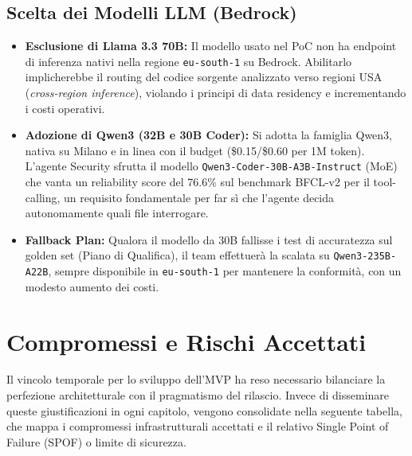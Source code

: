 \documentclass[11pt,a4paper]{article}
\begin{document}
\subsection{Scelta dei Modelli LLM (Bedrock)}

\begin{itemize}
    \item \textbf{Esclusione di Llama 3.3 70B:} Il modello usato nel PoC non ha endpoint di inferenza nativi nella regione \texttt{eu-south-1} su Bedrock. Abilitarlo implicherebbe il routing del codice sorgente analizzato verso regioni USA (\emph{cross-region inference}), violando i principi di data residency e incrementando i costi operativi.
    \item \textbf{Adozione di Qwen3 (32B e 30B Coder):} Si adotta la famiglia Qwen3, nativa su Milano e in linea con il budget (\$0.15/\$0.60 per 1M token). L'agente Security sfrutta il modello \texttt{Qwen3-Coder-30B-A3B-Instruct} (MoE) che vanta un reliability score del 76.6\% sul benchmark BFCL-v2 per il tool-calling, un requisito fondamentale per far sì che l'agente decida autonomamente quali file interrogare.
    \item \textbf{Fallback Plan:} Qualora il modello da 30B fallisse i test di accuratezza sul golden set (Piano di Qualifica), il team effettuerà la scalata su \texttt{Qwen3-235B-A22B}, sempre disponibile in \texttt{eu-south-1} per mantenere la conformità, con un modesto aumento dei costi.
\end{itemize}

\section{Compromessi e Rischi Accettati}
\label{sec:aws-compromessi}

Il vincolo temporale per lo sviluppo dell'MVP ha reso necessario bilanciare la perfezione architetturale con il pragmatismo del rilascio. Invece di disseminare queste giustificazioni in ogni capitolo, vengono consolidate nella seguente tabella, che mappa i compromessi infrastrutturali accettati e il relativo Single Point of Failure (SPOF) o limite di sicurezza.
\end{document}
